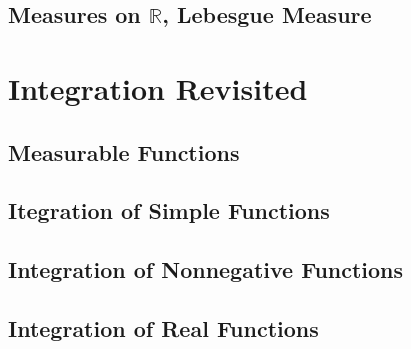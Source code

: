 \documentclass{article}
\newcommand{\R}{\mathbb{R}}
\theoremstyle{definition}
\begin{document}
	\subsection{Measures on $ \R $, Lebesgue Measure}
	\section{Integration Revisited}
	\subsection{Measurable Functions}
	\subsection{Itegration of Simple Functions}
	\subsection{Integration of Nonnegative Functions}
	\subsection{Integration of Real Functions}
	
\end{document}
